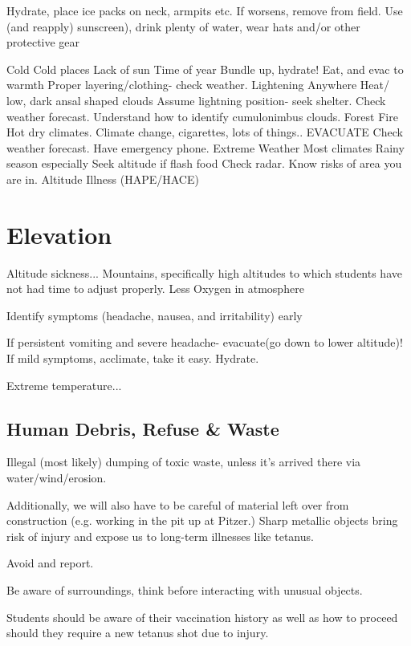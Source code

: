 \documentclass[12pt]{../SOP2}
\begin{document}
\NP Hydrate, place ice packs on neck, armpits etc. If worsens, remove from field.
Use (and reapply) sunscreen), drink plenty of water, wear hats and/or other protective gear

Cold
Cold places
Lack of sun
Time of year
Bundle up, hydrate! Eat, and evac to warmth
Proper layering/clothing- check weather.
Lightening
Anywhere
Heat/ low, dark ansal shaped clouds
Assume lightning position- seek shelter.
Check weather forecast. Understand how to identify cumulonimbus clouds.
Forest Fire
Hot dry climates.
Climate change, cigarettes, lots of things..
EVACUATE
Check weather forecast. Have emergency phone.
Extreme Weather
Most climates
Rainy season especially
Seek altitude if flash food
Check radar. Know risks of area you are in.
Altitude Illness (HAPE/HACE)

\section{Elevation}

\NP Altitude sickness... Mountains, specifically high altitudes to which students have not had time to adjust properly. Less Oxygen in atmosphere

\NP Identify symptoms (headache, nausea, and irritability) early

\NP If persistent vomiting and severe headache- evacuate(go down to lower altitude)! If mild symptoms, acclimate, take it easy. Hydrate.

\NP Extreme temperature...

\NP 

\NP 

\subsection{Human Debris, Refuse \& Waste}

Illegal (most likely) dumping of toxic waste, unless it’s arrived there via water/wind/erosion.


\NP Additionally, we will also have to be careful of material left over from construction (e.g. working in the pit up at Pitzer.) Sharp metallic objects bring risk of injury and expose us to long-term illnesses like tetanus.

\NP Avoid and report.

\NP Be aware of surroundings, think before interacting with unusual objects.

\NP Students should be aware of their vaccination history as well as how to proceed should they require a new tetanus shot due to injury.
\end{document}
